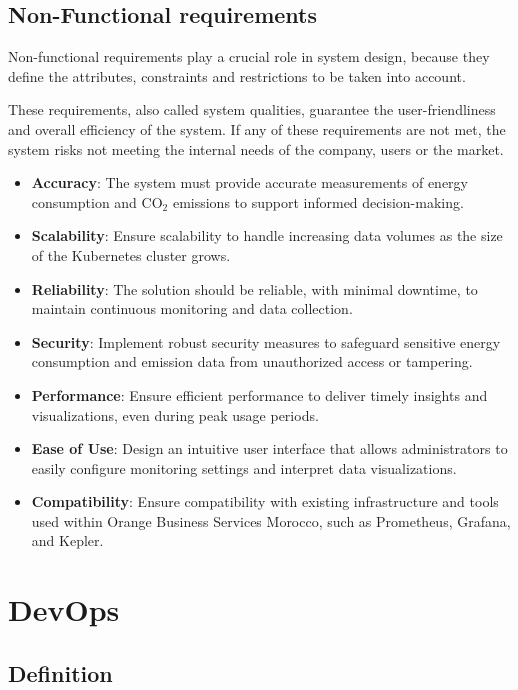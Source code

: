\subsection{Non-Functional requirements}

Non-functional requirements play a crucial role in system design,
because they define the attributes, constraints and restrictions to be taken into account.

These requirements, also called system qualities, guarantee the
user-friendliness and overall efficiency of the system. If any of these requirements are not met,
the system risks not meeting the internal needs of the company, users
or the market.

\begin{itemize}
  \item \textbf{Accuracy}: The system must provide accurate measurements of energy consumption and CO$_2$ emissions to support informed decision-making.
  \item \textbf{Scalability}: Ensure scalability to handle increasing data volumes as the size of the Kubernetes cluster grows.
  \item \textbf{Reliability}: The solution should be reliable, with minimal downtime, to maintain continuous monitoring and data collection.
  \item \textbf{Security}: Implement robust security measures to safeguard sensitive energy consumption and emission data from unauthorized access or tampering.
  \item \textbf{Performance}: Ensure efficient performance to deliver timely insights and visualizations, even during peak usage periods.
  \item \textbf{Ease of Use}: Design an intuitive user interface that allows administrators to easily configure monitoring settings and interpret data visualizations.
  \item \textbf{Compatibility}: Ensure compatibility with existing infrastructure and tools used within Orange Business Services Morocco, such as Prometheus, Grafana, and Kepler.
\end{itemize}


\section{DevOps}
\subsection{Definition}

